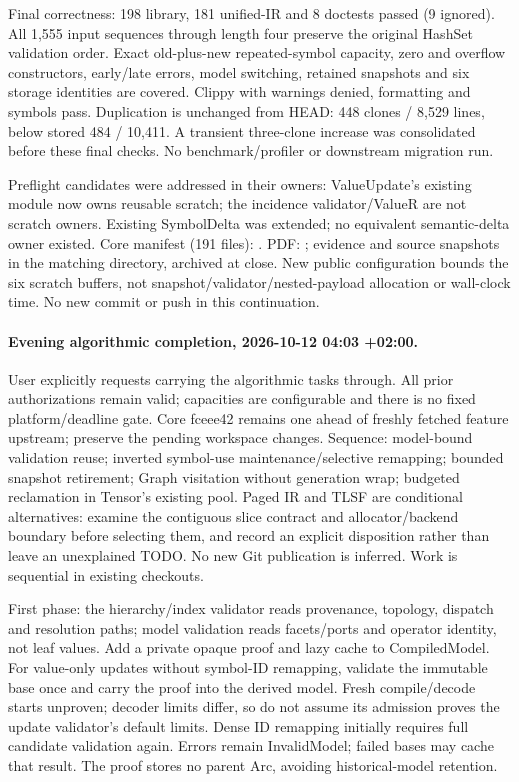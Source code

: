 \documentclass[11pt,a4paper]{article}
\begin{document}
Final correctness: 198 library, 181 unified-IR and 8 doctests passed (9 ignored).
All 1,555 input sequences through length four preserve the original HashSet
validation order. Exact old-plus-new repeated-symbol capacity, zero and overflow
constructors, early/late errors, model switching, retained snapshots and six
storage identities are covered. Clippy with warnings denied, formatting and
symbols pass. Duplication is unchanged from HEAD: 448 clones / 8,529 lines,
below stored 484 / 10,411. A transient three-clone increase was consolidated
before these final checks. No benchmark/profiler or downstream migration run.

Preflight candidates were addressed in their owners: ValueUpdate's existing
module now owns reusable scratch; the incidence validator/ValueR are not scratch
owners. Existing SymbolDelta was extended; no equivalent semantic-delta owner
existed. Core manifest (191 files):
.
PDF: ; evidence and source snapshots
in the matching directory, archived at close. New public configuration bounds
the six scratch buffers, not snapshot/validator/nested-payload allocation or
wall-clock time. No new commit or push in this continuation.

\paragraph{Evening algorithmic completion, 2026-10-12 04:03 +02:00.}
User explicitly requests carrying the algorithmic tasks through. All prior
authorizations remain valid; capacities are configurable and there is no fixed
platform/deadline gate. Core fceee42 remains one ahead of freshly fetched feature
upstream; preserve the pending workspace changes. Sequence: model-bound validation
reuse; inverted symbol-use maintenance/selective remapping; bounded snapshot
retirement; Graph visitation without generation wrap; budgeted reclamation in
Tensor's existing pool. Paged IR and TLSF are conditional alternatives: examine
the contiguous slice contract and allocator/backend boundary before selecting
them, and record an explicit disposition rather than leave an unexplained TODO.
No new Git publication is inferred. Work is sequential in existing checkouts.

First phase: the hierarchy/index validator reads provenance, topology, dispatch
and resolution paths; model validation reads facets/ports and operator identity,
not leaf values. Add a private opaque proof and lazy cache to CompiledModel.
For value-only updates without symbol-ID remapping, validate the immutable base
once and carry the proof into the derived model. Fresh compile/decode starts
unproven; decoder limits differ, so do not assume its admission proves the
update validator's default limits. Dense ID remapping initially requires full
candidate validation again. Errors remain InvalidModel; failed bases may cache
that result. The proof stores no parent Arc, avoiding historical-model retention.
\end{document}
